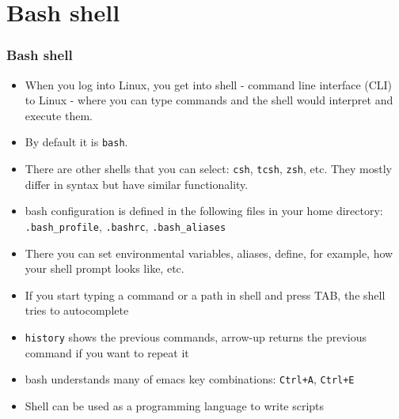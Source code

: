 \documentclass{beamer}
\begin{document}
\section{Bash shell}
\begin{frame}[fragile]
  \frametitle{Bash shell}
\begin{itemize}
\item When you log into Linux, you get into shell - command line interface (CLI) to Linux - where you can type commands and the shell would interpret and execute them. 
\item By default it is {\color{mycolorcli}\verb|bash|}. 
\item There are other shells that you can select: {\color{mycolorcli}\verb|csh|}, {\color{mycolorcli}\verb|tcsh|}, {\color{mycolorcli}\verb|zsh|}, etc.  They mostly differ in syntax but have similar functionality.
\item bash configuration is defined in the following files in your home directory: {\color{mycolorcli}\verb|.bash_profile|}, {\color{mycolorcli}\verb|.bashrc|}, {\color{mycolorcli}\verb|.bash_aliases|}
\item There you can set environmental variables, aliases, define, for example, how your shell prompt looks like, etc.
\item If you start typing a command or a path in shell and press {\color{mycolorcli}TAB}, the shell tries to
  autocomplete
\item {\color{mycolorcli}\verb|history|} shows the previous commands, {\color{mycolorcli}arrow-up}
  returns the previous command if you want to repeat it
\item bash understands many of emacs key combinations: {\color{mycolorcli}\verb|Ctrl+A|},
  {\color{mycolorcli}\verb|Ctrl+E|}
\item Shell can be used as a programming language to write scripts
\end{itemize}
\end{frame}
\end{document}
